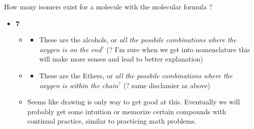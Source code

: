 \documentclass[12pt,a4paper]{article}
\begin{document}
\begin{enumerate}
    {\color{G-Moon}\item How many isomers exist for a molecule with the molecular formula ?}
        \begin{itemize}
            \item {\color{o-Sun}\textbf{7}}
                \begin{itemize}
                    \item {\tiny{}
                          \hspace{12pt}
                          \hspace{12pt}
                          \hspace{12pt}
                          }
                        \begin{itemize}
                            \item These are the alcohols, or {\color{y-Sun}\textit{all the possbile combinations where the oxygen is on the end}\(^{?}\)} ({\color{y-Sun}?} I'm sure when we get into nomenclature this will make more senses and lead to better explanation)
                        \end{itemize}
                    \item {\tiny{}
                          \hspace{12pt} 
                          \hspace{12pt} 
                          }
                        \begin{itemize}
                            \item These are the Ethers, or {\color{y-Sun}\textit{all the possbile combinations where the oxygen is within the chain}\(^{?}\)} ({\color{y-Sun}?} same disclamier as above)
                        \end{itemize}
                    \item Seems like drawing is only way to get good at this. Eventually we will probably get some intuition or memorize certain compounds with continual practice, similar to practicing math problems.
                \end{itemize}
        \end{itemize}

\end{enumerate}
\end{document}
